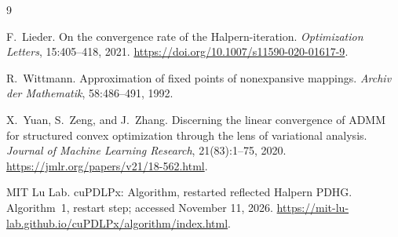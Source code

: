 \documentclass[11pt]{article}
\theoremstyle{remark}
\begin{document}
\begin{thebibliography}{9}

F.~Lieder.
On the convergence rate of the Halpern-iteration.
\emph{Optimization Letters}, 15:405--418, 2021.
\url{https://doi.org/10.1007/s11590-020-01617-9}.

R.~Wittmann.
Approximation of fixed points of nonexpansive mappings.
\emph{Archiv der Mathematik}, 58:486--491, 1992.

X.~Yuan, S.~Zeng, and J.~Zhang.
Discerning the linear convergence of ADMM for structured convex optimization through the lens of variational analysis.
\emph{Journal of Machine Learning Research}, 21(83):1--75, 2020.
\url{https://jmlr.org/papers/v21/18-562.html}.

MIT Lu Lab.
cuPDLPx: Algorithm, restarted reflected Halpern PDHG.
Algorithm~1, restart step; accessed November 11, 2026.
\url{https://mit-lu-lab.github.io/cuPDLPx/algorithm/index.html}.

\end{thebibliography}
\end{document}
